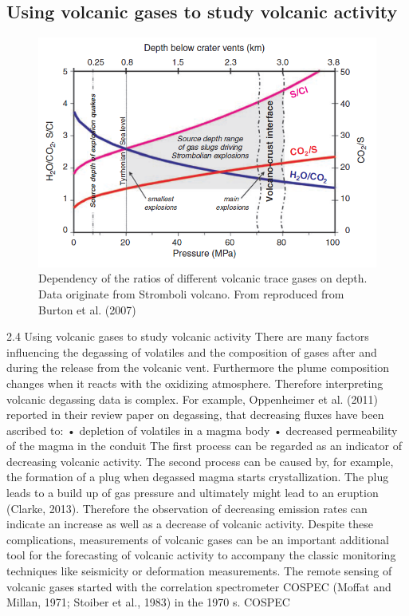 \documentclass  [
  paper    = a4,
  BCOR     = 10mm,
  twoside,
  fontsize = 12pt,
  fleqn,
  toc      = bibnumbered,
  toc      = listofnumbered,
  numbers  = noendperiod,
  headings = normal,
  listof   = leveldown,
  version  = 3.03
]                                       {scrreprt}
\begin{document}
{	\subsection{Using volcanic gases to study volcanic activity}
	\begin{figure}
		\centering
		\includegraphics[width=0.7\linewidth]{Zwischenbericht2018/Bilder/so2_bro}
		\caption{Dependency of the ratios of different volcanic trace gases on depth. Data originate from Stromboli volcano. From \cite{lubcke2014optical} reproduced from Burton et al. (2007)}
		\label{fig:so2bro}
	\end{figure}	
	2.4 Using volcanic gases to study volcanic activity
	There are many factors influencing the degassing of volatiles and the composition
	of gases after and during the release from the volcanic vent. Furthermore the
	plume composition changes when it reacts with the oxidizing atmosphere. Therefore
	interpreting volcanic degassing data is complex. For example, Oppenheimer
	et al. (2011) reported in their review paper on  degassing, that decreasing
	 fluxes have been ascribed to:
	• depletion of volatiles in a magma body
	• decreased permeability of the magma in the conduit
	The first process can be regarded as an indicator of decreasing volcanic activity.
	The second process can be caused by, for example, the formation of a plug when
	degassed magma starts crystallization. The plug leads to a build up of gas
	pressure and ultimately might lead to an eruption (Clarke, 2013). Therefore the
	observation of decreasing  emission rates can indicate an increase as well as
	a decrease of volcanic activity.
	Despite these complications, measurements of volcanic gases can be an important
	additional tool for the forecasting of volcanic activity to accompany
	the classic monitoring techniques like seismicity or deformation measurements.
	The remote sensing of volcanic gases started with the correlation spectrometer
	COSPEC (Moffat and Millan, 1971; Stoiber et al., 1983) in the 1970 s. COSPEC 
}
\end{document}
